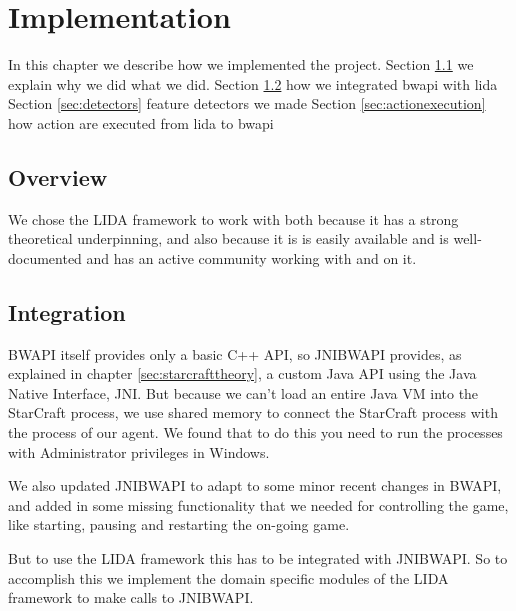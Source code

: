 
\chapter{Implementation}
In this chapter we describe how we implemented the project.
Section \ref{sec:overview} we explain why we did what we did.
Section \ref{sec:integration} how we integrated bwapi with lida
Section \ref{sec:detectors} feature detectors we made
Section \ref{sec:actionexecution} how action are executed from lida to bwapi

\section{Overview} 
\label{sec:overview}
We chose the LIDA framework to work with both because it has a strong theoretical underpinning, and also because it is is easily available and is well-documented and has an active community working with and on it.

\section{Integration}
\label{sec:integration}
BWAPI itself provides only a basic C++ API, so JNIBWAPI provides, as explained in chapter \ref{sec:starcrafttheory}, a custom Java API using the Java Native Interface, JNI.\cite{jni} But because we can't load an entire Java VM into the StarCraft process, we use shared memory to connect the StarCraft process with the process of our agent. We found that to do this you need to run the processes with Administrator privileges in Windows.

We also updated JNIBWAPI to adapt to some minor recent changes in BWAPI, and added in some missing functionality that we needed for controlling the game, like starting, pausing and restarting the on-going game.

But to use the LIDA framework this has to be integrated with JNIBWAPI. So to accomplish this we implement the domain specific modules of the LIDA framework to make calls to JNIBWAPI. 


